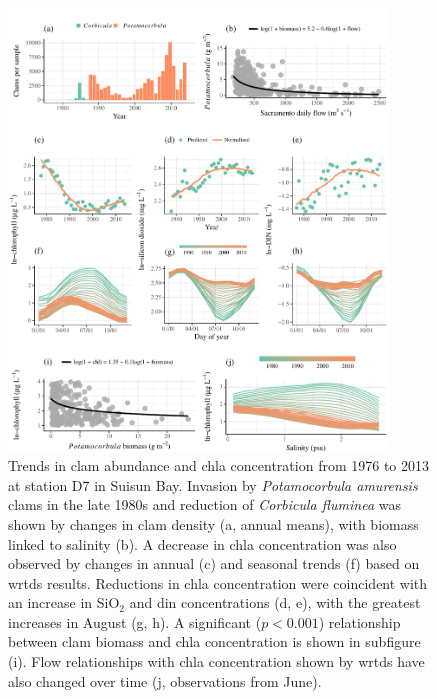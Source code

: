 \documentclass[journal = esthag, manuscript = article]{achemso}\usepackage[]{graphicx}\usepackage[]{color}
\begin{document}
\begin{figure}[!ht]

{\centering \includegraphics[width=0.9\textwidth]{figs/clmchl-1} 

}

\caption{Trends in clam abundance and \ac{chla} concentration from 1976 to 2013 at station D7 in Suisun Bay.  Invasion by \textit{Potamocorbula amurensis} clams in the late 1980s and reduction of \textit{Corbicula fluminea} was shown by changes in clam density (a, annual means), with biomass linked to salinity (b).  A decrease in \ac{chla} concentration was also observed by changes in annual (c) and seasonal trends (f) based on \ac{wrtds} results.  Reductions in \ac{chla} concentration were coincident with an increase in SiO$_2$ and \ac{din} concentrations (d, e), with the greatest increases in August (g, h). A significant ($p < 0.001$) relationship between clam biomass and \ac{chla} concentration is shown in subfigure (i).  Flow relationships with \ac{chla} concentration shown by \ac{wrtds} have also changed over time (j, observations from June).}\label{fig:clmchl}
\end{figure}



\clearpage
\end{document}
